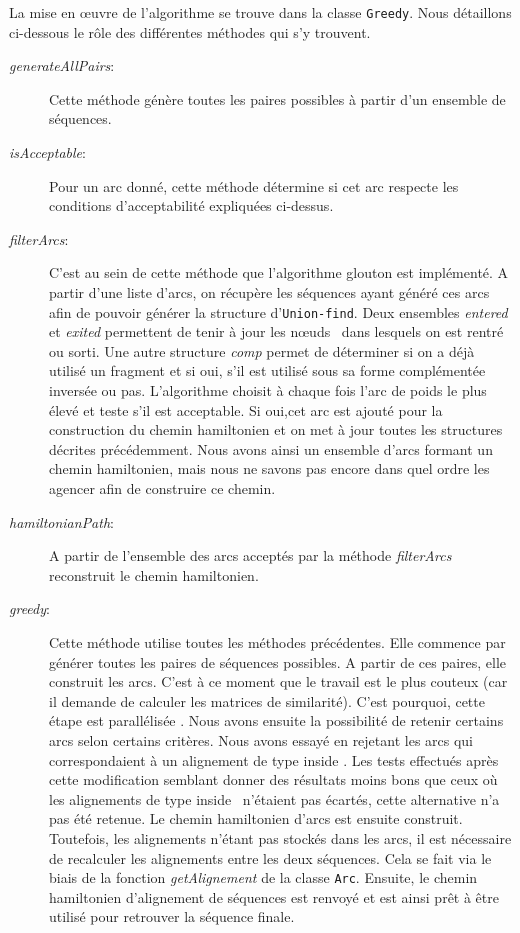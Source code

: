 La mise en \oe{}uvre de l'algorithme se trouve dans la classe \verb|Greedy|. Nous détaillons ci-dessous le rôle des différentes méthodes qui s'y trouvent.

\begin{description}
	\item[\emph{generateAllPairs}:] Cette méthode génère toutes les paires possibles à partir d'un ensemble de séquences.
	\item[\emph{isAcceptable}:] Pour un arc donné, cette méthode détermine si cet arc respecte les conditions d'acceptabilité expliquées ci-dessus. 
	\item[\emph{filterArcs}:] C'est au sein de cette méthode que l'algorithme glouton est implémenté. A partir d'une liste d'arcs, on récupère les séquences ayant généré ces arcs afin de pouvoir générer la structure d'\verb|Union-find|. Deux ensembles \emph{entered} et \emph{exited} permettent de tenir à jour les \og n\oe{}uds \fg~dans lesquels on est rentré ou sorti. Une autre structure \emph{comp} permet de déterminer si on a déjà utilisé un fragment et si oui, s'il est utilisé sous sa forme complémentée inversée ou pas. L'algorithme choisit à chaque fois l'arc de poids le plus élevé et teste s'il est acceptable. Si oui,cet arc est ajouté pour la construction du chemin hamiltonien et on met à jour toutes les structures décrites précédemment. Nous avons ainsi un ensemble d'arcs formant un chemin hamiltonien, mais nous ne savons pas encore dans quel ordre les agencer afin de construire ce chemin.
	\item[\emph{hamiltonianPath}:] A partir de l'ensemble des arcs acceptés par la méthode \emph{filterArcs} reconstruit le chemin hamiltonien.
	\item[\emph{greedy}:] Cette méthode utilise toutes les méthodes précédentes. Elle commence par générer toutes les paires de séquences possibles. A partir de ces paires, elle construit les arcs. C'est à ce moment que le travail est le plus couteux (car il demande de calculer les matrices de similarité). C'est pourquoi, cette étape est parallélisée . Nous avons ensuite la possibilité de retenir certains arcs selon certains critères. Nous avons essayé en rejetant les arcs qui correspondaient à un alignement de type \og inside \fg. Les tests effectués après cette modification semblant donner des résultats moins bons que ceux où les alignements de type \og inside \fg~n'étaient pas écartés, cette alternative n'a pas été retenue. Le chemin hamiltonien d'arcs est ensuite construit. Toutefois, les alignements n'étant pas stockés dans les arcs, il est nécessaire de recalculer les alignements entre les deux séquences. Cela se fait via le biais de la fonction \emph{getAlignement} de la classe \verb|Arc|. 
	Ensuite, le chemin hamiltonien d'alignement de séquences est renvoyé et est ainsi prêt à être utilisé pour retrouver la séquence finale.	
\end{description}

